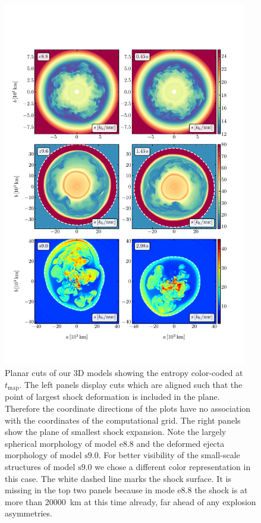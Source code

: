\documentclass[fleqn,usenatbib]{mnras}
\newcommand{\onemg}{\ensuremath{\mathrm{e8.8}}\xspace}
\newcommand{\snine}{\ensuremath{\mathrm{s9.0}}\xspace}
\begin{document}
\begin{figure}
 \centering
 \includegraphics[width=0.95\textwidth,trim=0cm 1.8cm 0cm 3cm,clip]{pic/all_3d_sto_slices_time_0.pdf}
 \caption{Planar cuts of our 3D models showing the entropy color-coded at 
 $t_{\mathrm{map}}$. The left panels display cuts which are aligned such that 
 the point of largest shock deformation is included in the plane. Therefore the 
 coordinate directions of the plots have no association with the coordinates of the computational 
 grid. The right panels show the plane of smallest shock expansion. 
 Note the largely spherical morphology of model \onemg and the deformed ejecta morphology 
 of model \snine. For better visibility of the small-scale structures of model \snine we 
 chose a different color representation in this case.
 The white dashed line marks the shock surface. It is missing in the top two panels because
 in mode \onemg the shock is at more than 20000~km at this time already, far ahead of any
 explosion asymmetries.}
 \label{fig:slices first mapping}
\end{figure}
\end{document}
